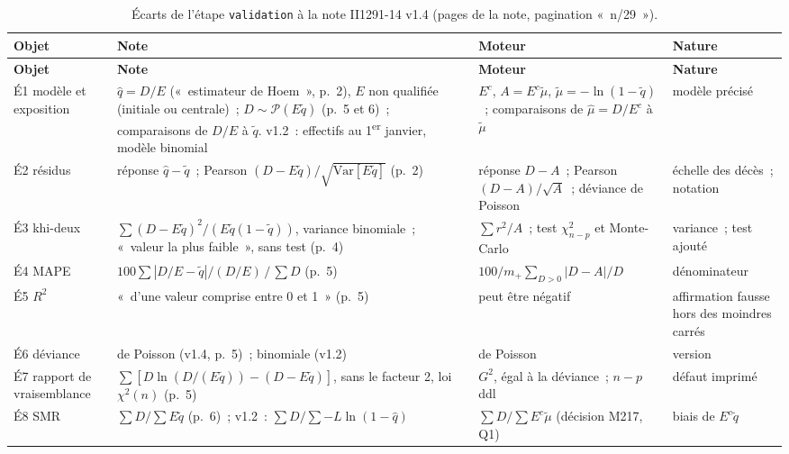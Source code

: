 \documentclass[a4paper,11pt]{article}
\newcommand{\code}[1]{\texttt{\small #1}}
\begin{document}
{\footnotesize
{}
\begin{longtable}{@{}p{2.3cm}p{5.0cm}p{4.6cm}p{2.7cm}@{}}
\caption{Écarts de l'étape \code{validation} à la note II1291-14 v1.4 (pages de la note, pagination «~n/29~»).}
\label{tab:ecarts-ii1291-14}\\
\rowcolor{tableheader}
\textcolor{financeblue}{\textbf{Objet}} &
\textcolor{financeblue}{\textbf{Note}} &
\textcolor{financeblue}{\textbf{Moteur}} &
\textcolor{financeblue}{\textbf{Nature}} \\
\endfirsthead
\rowcolor{tableheader}
\textcolor{financeblue}{\textbf{Objet}} &
\textcolor{financeblue}{\textbf{Note}} &
\textcolor{financeblue}{\textbf{Moteur}} &
\textcolor{financeblue}{\textbf{Nature}} \\
\endhead
É1 modèle et exposition & $\hat q = D/E$ («~estimateur de Hoem~», p.~2), $E$ non qualifiée (initiale ou centrale)~; $D \sim \mathcal{P}(E\tilde q)$ (p.~5 et 6)~; comparaisons de $D/E$ à $\tilde q$. v1.2~: effectifs au 1\textsuperscript{er} janvier, modèle binomial & $E^c$, $A = E^c\tilde\mu$, $\tilde\mu = -\ln(1 - \tilde q)$~; comparaisons de $\hat\mu = D/E^c$ à $\tilde\mu$ & modèle précisé \\
É2 résidus & réponse $\hat q - \tilde q$~; Pearson $(D - E\tilde q)/\sqrt{\mathrm{Var}[E\tilde q]}$ (p.~2) & réponse $D - A$~; Pearson $(D - A)/\sqrt{A}$~; déviance de Poisson & échelle des décès~; notation \\
É3 khi-deux & $\sum (D - E\tilde q)^2/(E\tilde q(1 - \tilde q))$, variance binomiale~; «~valeur la plus faible~», sans test (p.~4) & $\sum r^2/A$~; test $\chi^2_{n-p}$ et Monte-Carlo & variance~; test ajouté \\
É4 MAPE & $100 \sum |D/E - \tilde q|/(D/E) \,/\, \sum D$ (p.~5) & $100/m_{+} \sum_{D>0} |D - A|/D$ & dénominateur \\
É5 $R^2$ & «~d'une valeur comprise entre 0 et 1~» (p.~5) & peut être négatif & affirmation fausse hors des moindres carrés \\
É6 déviance & de Poisson (v1.4, p.~5)~; binomiale (v1.2) & de Poisson & version \\
É7 rapport de vraisemblance & $\sum [D\ln(D/(E\tilde q)) - (D - E\tilde q)]$, sans le facteur 2, loi $\chi^2(n)$ (p.~5) & $G^2$, égal à la déviance~; $n - p$ ddl & défaut imprimé \\
É8 SMR & $\sum D / \sum E\tilde q$ (p.~6)~; v1.2~: $\sum D / \sum -L\ln(1 - \hat q)$ & $\sum D / \sum E^c\tilde\mu$ (décision M217, Q1) & biais de $E^c\tilde q$ \\

\end{longtable}}
\end{document}
